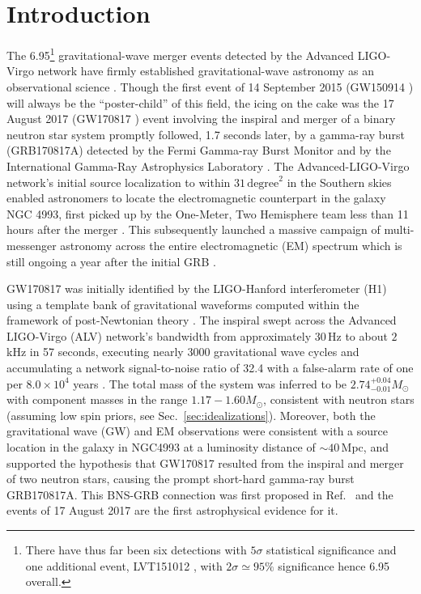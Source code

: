 \documentclass[prd,amsmath,amssymb,aps,floats,amsfonts,notitlepage,superscriptaddress,eqsecnum,nofootinbib,10pt]{revtex4-1}
\begin{document}
\section{Introduction}\label{Sec:Intro}
The 6.95\footnote{There have thus far been six detections with $5\sigma$ statistical significance and one additional event, LVT151012 \cite{TheLIGOScientific:2016pea}, with $2\sigma \simeq 95\%$ significance hence 6.95 overall.} 
gravitational-wave merger events detected by the Advanced LIGO-Virgo network have firmly established gravitational-wave astronomy
as an observational science \cite{TheLIGOScientific:2016pea, Abbott:2017gyy, Abbott:2017oio, Abbott:2017vtc, GW170817}. 
Though the first event of 14 September 2015 (GW150914 \cite{GW150914}) will always be the ``poster-child'' of this field,
the icing on the cake was the 17 August 2017 (GW170817 \cite{GW170817}) event involving the inspiral and merger of a binary neutron star system 
promptly followed, 1.7 seconds later, by a gamma-ray burst (GRB170817A) detected by the Fermi Gamma-ray Burst Monitor \cite{Fermi} and by the International Gamma-Ray Astrophysics Laboratory \cite{Svinkin, Savchenko:2017ffs}.
The Advanced-LIGO-Virgo network's initial source localization to within $ 31\,\text{degree}^2$ in the Southern skies
enabled astronomers to locate the electromagnetic counterpart in the galaxy NGC 4993, 
first picked up by the One-Meter, Two Hemisphere team less than 11 hours after the merger \cite{Coulter2017, Coulter:2017wya}.
This subsequently launched a massive campaign of multi-messenger astronomy across the entire electromagnetic (EM) spectrum which is still ongoing
a year after the initial GRB \cite{GBM:2017lvd}. 

GW170817 was initially identified by the LIGO-Hanford interferometer (H1) 
using a template bank of gravitational waveforms computed within the framework of post-Newtonian theory \cite{Buonanno:2009zt, Blanchet_LRR}.
The inspiral swept across the Advanced LIGO-Virgo (ALV) network's bandwidth from approximately $ 30\,$Hz to about $ 2\,$kHz in 57 seconds,
executing nearly $ 3000$ gravitational wave cycles and accumulating a network signal-to-noise ratio of 32.4 with a false-alarm rate of one per $8.0\times 10^4$ years \cite{GW170817}. 
The total mass of the system was inferred to be $2.74^{+0.04}_{-0.01} M_\odot$ with component masses in the range $1.17-1.60 M_\odot$, consistent
with neutron stars (assuming low spin priors, see Sec.~\ref{sec:idealizations}).
Moreover, both the gravitational wave (GW) and EM observations were consistent with a source location in the galaxy in NGC4993 
at a luminosity distance of $\sim\! 40\,$Mpc, and supported the hypothesis that GW170817 resulted from the
inspiral and merger of two neutron stars, causing the prompt short-hard gamma-ray burst GRB170817A. %
This BNS-GRB connection was first proposed in Ref.~\cite{Eichler:1989ve} and the events of 17 August 2017 are
the first astrophysical evidence for it.
\end{document}
